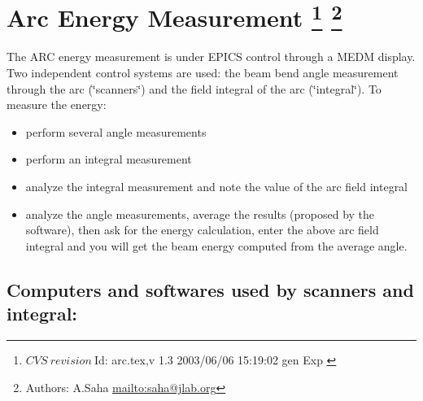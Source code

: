 \section[Arc Energy Measurement]{Arc Energy Measurement
\footnote{
  $CVS~revision~ $Id: arc.tex,v 1.3 2003/06/06 15:19:02 gen Exp $ $
}
\footnote{Authors: A.Saha \url{mailto:saha@jlab.org}}
}

\providecommand{\LyX}{L\kern-.1667em\lower.25em\hbox{Y}\kern-.125emX\@}

\newenvironment{lyxlist}[1]
  {\begin{list}{}
    {\settowidth{\labelwidth}{#1}
     \setlength{\leftmargin}{\labelwidth}
     \addtolength{\leftmargin}{\labelsep}
     \renewcommand{\makelabel}[1]{##1 \hfill}}}
  {\end{list}}

\newenvironment{lyxcode}
  {\begin{list}{}{
    \setlength{\rightmargin}{\leftmargin}
    \raggedright
    \setlength{\itemsep}{0pt}
    \setlength{\parsep}{0pt}
    \ttfamily}%
   \item[]}
  {\end{list}}

The ARC energy measurement is under EPICS control through a MEDM display. Two
independent control systems are used: the beam bend angle measurement through
the arc (\char`\"{}scanners\char`\"{}) and the field integral of
the arc (\char`\"{}integral\char`\"{}). To measure the energy: 

\begin{itemize}
\item perform several angle measurements 
\item perform an integral measurement 
\item analyze the integral measurement and note the value of the arc field integral 
\item analyze the angle measurements, average the results (proposed by the software),
then ask for the energy calculation, enter the above arc field integral and
you will get the beam energy computed from the average angle. 
\end{itemize}

\subsection{Computers and softwares used by scanners and integral: }

